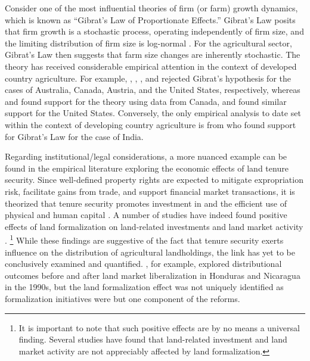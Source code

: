 \documentclass[english]{article}
\begin{document}
Consider one of the most influential theories of firm (or farm) growth 
dynamics, which is known as ``Gibrat's Law of Proportionate Effects.''
Gibrat's Law posits that firm growth is a stochastic process, operating 
independently of firm size, and the limiting distribution of firm size is 
log-normal \citep{gibrat1931, sutton1997}.
For the agricultural sector, Gibrat's Law then suggests that farm size 
changes are inherently stochastic.
The theory has received considerable empirical attention in the context
of developed country agriculture.
For example, \citet{jarrett1968}, \citet{shapiro1987}, \citet{weiss1999}, 
and \citet{melhim2009a} rejected Gibrat's hypothesis for the cases of 
Australia, Canada, Austria, and the United States, respectively, whereas 
\citet{clark1992} and \citet{fulton1995} found support for the theory 
using data from Canada, and \citet{melhim2009b} found similar support 
for the United States.
Conversely, the only empirical analysis to date set within the context of 
developing country agriculture is from \citet{shergill1991} who found 
support for Gibrat's Law for the case of India.

Regarding institutional/legal considerations, a more nuanced example can be 
found in the empirical literature exploring the economic effects of land 
tenure security.
Since well-defined property rights are expected to mitigate expropriation risk, 
facilitate gains from trade, and support financial market transactions, it is 
theorized that tenure security promotes investment in and the efficient use 
of physical and human capital \citep{besley2010}.
A number of studies have indeed found positive effects of land formalization 
on land-related investments \citep{feder1988, besley1995, deininger2008} and 
land market activity \citep{deininger2003, boucher2005, deininger2008b}.%
\footnote{It is important to note that such positive effects are by no means
a universal finding. 
Several studies have found that land-related investment \citep{migot1991, 
gavian1996, brasselle2002} and land market activity \citep{deininger2005, 
gould2006, barnes2007} are not appreciably affected by land formalization.}
While these findings are suggestive of the fact that tenure security exerts 
influence on the distribution of agricultural landholdings, the link has yet 
to be conclusively examined and quantified.
\citet{boucher2005}, for example, explored distributional outcomes before 
and after land market liberalization in Honduras and Nicaragua in the 1990s, 
but the land formalization effect was not uniquely identified as formalization 
initiatives were but one component of the reforms.
\end{document}
